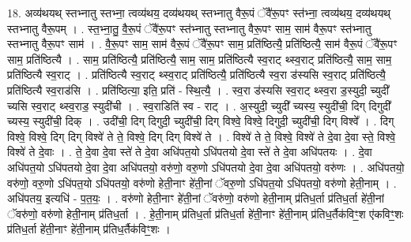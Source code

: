 \documentclass[17pt]{extarticle}
\begin{document}
18. अव्य॑थयथ् स्तभ्नातु स्तभ्ना॒ त्वव्य॑थय॒ दव्य॑थयथ् स्तभ्नातु वैरू॒पं ॅवै॑रू॒पꣳ 
स्त॑भ्ना॒ त्वव्य॑थय॒ दव्य॑थयथ् स्तभ्नातु वैरू॒पम् । . स्त॒भ्ना॒तु॒ वै॒रू॒पं ॅवै॑रू॒पꣳ स्त॑भ्नातु स्तभ्नातु वैरू॒पꣳ साम॒ साम॑ वैरू॒पꣳ स्त॑भ्नातु 
स्तभ्नातु वैरू॒पꣳ साम॑ । . वै॒रू॒पꣳ साम॒ साम॑ वैरू॒पं ॅवै॑रू॒पꣳ साम॒ प्रति॑ष्ठित्यै॒ प्रति॑ष्ठित्यै॒ साम॑ वैरू॒पं ॅवै॑रू॒पꣳ साम॒ प्रति॑ष्ठित्यै । . साम॒ प्रति॑ष्ठित्यै॒ प्रति॑ष्ठित्यै॒ साम॒ साम॒ प्रति॑ष्ठित्यै स्व॒राट् थ्स्व॒राट् प्रति॑ष्ठित्यै॒ साम॒ साम॒ प्रति॑ष्ठित्यै स्व॒राट् । . प्रति॑ष्ठित्यै स्व॒राट् थ्स्व॒राट् प्रति॑ष्ठित्यै॒ प्रति॑ष्ठित्यै स्व॒रा ड॑स्यसि स्व॒राट् प्रति॑ष्ठित्यै॒ प्रति॑ष्ठित्यै स्व॒राड॑सि । . प्रति॑ष्ठित्या॒ इति॒ प्रति॑ - स्थि॒त्यै॒ । . स्व॒रा ड॑स्यसि स्व॒राट् थ्स्व॒रा ड॒स्युदी॒ च्युदी᳚ च्यसि स्व॒राट् थ्स्व॒राड॒ स्युदी॑ची । . स्व॒राडिति॑ स्व - राट् । . अ॒स्युदी॒ च्युदी᳚ च्यस्य॒ स्युदी॑ची॒ दिग् दिगुदी᳚ च्यस्य॒ स्युदी॑ची॒ दिक् । . उदी॑ची॒ दिग् दिगुदी॒ च्युदी॑ची॒ दिग् विश्वे॒ विश्वे॒ दिगुदी॒ च्युदी॑ची॒ दिग् विश्वे᳚ । . दिग् विश्वे॒ विश्वे॒ दिग् दिग् विश्वे॑ ते ते॒ विश्वे॒ दिग् दिग् विश्वे॑ ते । . विश्वे॑ ते ते॒ विश्वे॒ विश्वे॑ ते दे॒वा दे॒वा स्ते॒ विश्वे॒ विश्वे॑ ते दे॒वाः । . ते॒ दे॒वा दे॒वा स्ते॑ ते दे॒वा अधि॑पत॒यो ऽधि॑पतयो दे॒वा स्ते॑ ते दे॒वा अधि॑पतयः । . दे॒वा अधि॑पत॒यो ऽधि॑पतयो दे॒वा दे॒वा अधि॑पतयो॒ वरु॑णो॒ वरु॒णो ऽधि॑पतयो दे॒वा दे॒वा अधि॑पतयो॒ वरु॑णः । . अधि॑पतयो॒ वरु॑णो॒ वरु॒णो ऽधि॑पत॒यो ऽधि॑पतयो॒ वरु॑णो हेती॒नाꣳ हे॑ती॒नां ॅवरु॒णो ऽधि॑पत॒यो ऽधि॑पतयो॒ वरु॑णो हेती॒नाम् । . अधि॑पतय॒ इत्यधि॑ - प॒त॒यः॒ । . वरु॑णो हेती॒नाꣳ हे॑ती॒नां ॅवरु॑णो॒ वरु॑णो हेती॒नाम् प्र॑तिध॒र्ता प्र॑तिध॒र्ता हे॑ती॒नां ॅवरु॑णो॒ वरु॑णो हेती॒नाम् प्र॑तिध॒र्ता । . हे॒ती॒नाम् प्र॑तिध॒र्ता प्र॑तिध॒र्ता हे॑ती॒नाꣳ हे॑ती॒नाम् प्र॑तिध॒र्तैक॑विꣳ॒॒श ए॑कविꣳ॒॒शः प्र॑तिध॒र्ता हे॑ती॒नाꣳ हे॑ती॒नाम् प्र॑तिध॒र्तैक॑विꣳ॒॒शः । \newline
\end{document}
